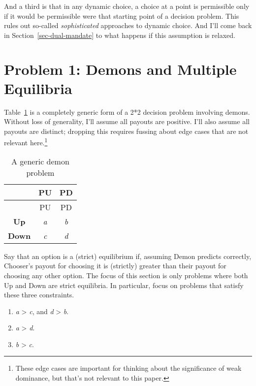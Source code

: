 \documentclass[
  10pt,
  letterpaper,
  DIV=11,
  numbers=noendperiod,
  twoside]{scrartcl}
\providecommand{\tightlist}{%
  \setlength{\itemsep}{0pt}\setlength{\parskip}{0pt}}\usepackage{longtable,booktabs,array}
\begin{document}
And a third is that in any dynamic choice, a choice at a point is
permissible only if it would be permissible were that starting point of
a decision problem. This rules out so-called \emph{sophisticated}
approaches to dynamic choice. And I'll come back in
Section~\ref{sec-dual-mandate} to what happens if this assumption is
relaxed.

\section{Problem 1: Demons and Multiple Equilibria}\label{sec-multiple}

Table~\ref{tbl-generic-demon} is a completely generic form of a 2*2
decision problem involving demons. Without loss of generality, I'll
assume all payouts are positive. I'll also assume all payouts are
distinct; dropping this requires fussing about edge cases that are not
relevant here.\footnote{These edge cases are important for thinking
  about the significance of weak dominance, but that's not relevant to
  this paper.}

\begin{longtable}[]{@{}ccc@{}}
\caption{A generic demon
problem}\label{tbl-generic-demon}\tabularnewline
\toprule\noalign{}
& PU & PD \\
\midrule\noalign{}
\endfirsthead
\toprule\noalign{}
& PU & PD \\
\midrule\noalign{}
\endhead
\bottomrule\noalign{}
\endlastfoot
\textbf{Up} & \emph{a} & \emph{b} \\
\textbf{Down} & \emph{c} & \emph{d} \\
\end{longtable}

Say that an option is a (strict) equilibrium if, assuming Demon predicts
correctly, Chooser's payout for choosing it is (strictly) greater than
their payout for choosing any other option. The focus of this section is
only problems where both Up and Down are strict equilibria. In
particular, focus on problems that satisfy these three constraints.

\begin{enumerate}
\def\labelenumi{\arabic{enumi}.}
\tightlist
\item
  \emph{a} \textgreater{} \emph{c}, and \emph{d} \textgreater{}
  \emph{b}.
\item
  \emph{a} \textgreater{} \emph{d}.
\item
  \emph{b} \textgreater{} \emph{c}.
\end{enumerate}
\end{document}
